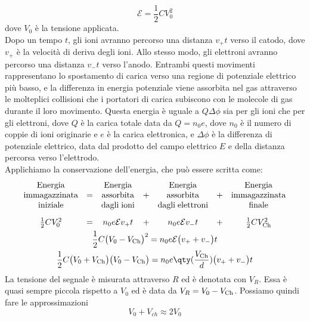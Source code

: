 \begin{approfondimento}
   \begin{equation*}
      \mathcal{E}=\frac{1}{2}CV_0^2
   \end{equation*}
   dove $V_0$ è la tensione applicata.\\
   Dopo un tempo $t$, gli ioni avranno percorso una distanza $v_{+}t$ verso il catodo, dove $v_{+} $ è la velocità di deriva degli ioni. Allo stesso modo, gli elettroni avranno percorso una distanza $v_{-}t$ verso l'anodo. Entrambi questi movimenti rappresentano lo spostamento di carica verso una regione di potenziale elettrico più basso, e la differenza in energia potenziale viene assorbita nel gas attraverso le molteplici collisioni che i portatori di carica subiscono con le molecole di gas durante il loro movimento. Questa energia è uguale a $Q \Delta\phi$ sia per gli ioni che per gli elettroni, dove $Q$ è la carica totale data da $Q=n_0e$, dove $n_0$ è il numero di coppie di ioni originarie e $e$ è la carica elettronica, e $\Delta\phi$ è la differenza di potenziale elettrico, data dal prodotto del campo elettrico $E$ e della distanza percorsa verso l'elettrodo.\\
   Applichiamo la conservazione dell'energia, che può essere scritta come:
   \begin{gather*}
      \begin{array}{ccccccc}
         \rm Energia &  & \rm Energia &  & \rm Energia & & \rm Energia\\
         \rm immagazzinata & = & \rm assorbita & + & \rm assorbita & + & \rm immagazzinata\\
         \rm iniziale &  & \rm dagli \; ioni &  & \rm dagli \; elettroni &  & \rm finale\\[0.3cm]
         \frac{1}{2}CV_0^2 & = & n_0 e \mathcal{E} v_{+} t & + & n_0 e \mathcal{E} v_{-} t & + & \frac{1}{2}CV_{\rm Ch}^2
      \end{array}
      \\
      \frac{1}{2}C \bigl( V_0 - V_{\rm Ch} \bigr)^2
      =n_0 e \mathcal{E} \bigl( v_{+} + v_{-} \bigr) t
      \\
      \frac{1}{2}C \bigl( V_0 + V_{\rm Ch} \bigr)\bigl( V_0 - V_{\rm Ch} \bigr)
      =n_0 e \qty( \frac{V_{\rm Ch}}{d} ) \bigl( v_{+} + v_{-} \bigr) t
   \end{gather*}
   La tensione del segnale è misurata attraverso $R$ ed è denotata con $V_R$. Essa è quasi sempre piccola rispetto a $V_0$ ed è data da $V_R=V_0-V_{\rm Ch}$. Possiamo quindi fare le approssimazioni
   \begin{equation*}
      V_0 + V_{ch} \approx 2 V_0

\end{equation*}
\end{approfondimento}
